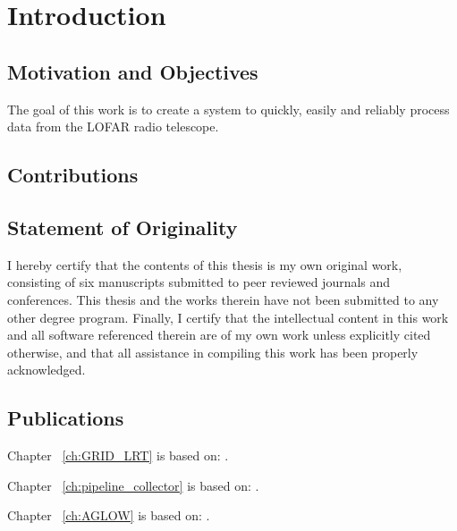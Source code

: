 \chapter{Introduction}

\section{Motivation and Objectives}

The goal of this work is to create a system to quickly, easily and reliably process data from the LOFAR radio telescope. 




\section{Contributions}




\section{Statement of Originality}

I hereby certify that the contents of this thesis is my own original work, consisting of six manuscripts submitted to peer reviewed journals and conferences. This thesis and the works therein have not been submitted to any other degree program. Finally, I certify that the intellectual content in this work and all software referenced therein are of my own work unless explicitly cited otherwise, and that all assistance in compiling this work has been properly acknowledged.

\section{Publications}


Chapter ~\ref{ch:GRID_LRT} is based on:  .

Chapter ~\ref{ch:pipeline_collector} is based on: .

Chapter ~\ref{ch:AGLOW} is based on: .

